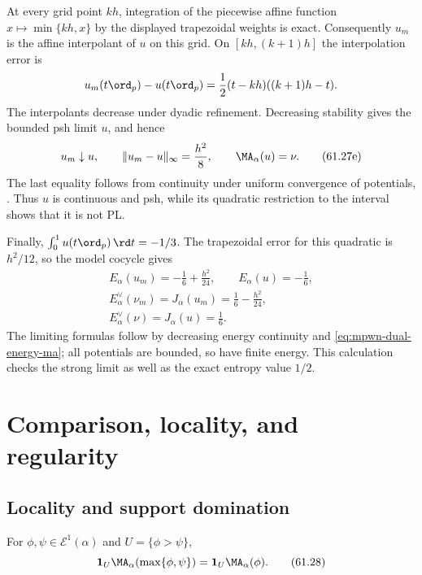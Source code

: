 \begin{example}
At every grid point $kh$, integration of the piecewise affine
function $x\mapsto\min\{kh,x\}$ by the displayed trapezoidal weights
is exact. Consequently $u_m$ is the affine interpolant of $u$
on this grid. On $[kh,(k+1)h]$ the interpolation error is
\[
 u_m(t\ord_p)-u(t\ord_p)
       =\frac12(t-kh)((k+1)h-t).
\]
The interpolants decrease under dyadic refinement. Decreasing
stability gives the bounded psh limit $u$, and hence
\[
 u_m\downarrow u,\qquad
 \|u_m-u\|_\infty=\frac{h^2}{8},\qquad
 \MA_\alpha(u)=\nu.
\tag{61.27e}\label{eq:mpwn-interval-uniform-error}
\]
The last equality follows from continuity under uniform convergence
of potentials, \cite[Proposition~2.3.2]{MPWN25}.
Thus $u$ is continuous and psh, while its quadratic restriction
to the interval shows that it is not PL.

Finally, $\int_0^1u(t\ord_p)\,\rd t=-1/3$. The trapezoidal error
for this quadratic is $h^2/12$, so the model cocycle gives
\[
 \begin{gathered}
 E_\alpha(u_m)=-\frac16+\frac{h^2}{24},\qquad
 E_\alpha(u)=-\frac16,\\
 E_\alpha^\vee(\nu_m)=J_\alpha(u_m)=\frac16-\frac{h^2}{24},\\
 E_\alpha^\vee(\nu)=J_\alpha(u)=\frac16 .
 \end{gathered}
\tag{61.27f}\label{eq:mpwn-interval-exact-energies}
\]
The limiting formulas follow by decreasing energy continuity and
\eqref{eq:mpwn-dual-energy-ma}; all potentials are bounded, so have
finite energy. This calculation checks the strong limit as well
as the exact entropy value $1/2$.
\end{example}


\section{Comparison, locality, and regularity}
\label{sec:mpwn-regularity}

\subsection{Locality and support domination}
\label{subsec:mpwn-locality}

\begin{theorem}\label{thm:mpwn-locality}
For $\phi,\psi\in\mathcal E^1(\alpha)$ and
$U=\{\phi>\psi\}$,
\[
 \mathbf1_U\MA_\alpha(\max\{\phi,\psi\})
      =\mathbf1_U\MA_\alpha(\phi).
\tag{61.28}\label{eq:mpwn-locality}
\]
\end{theorem}

